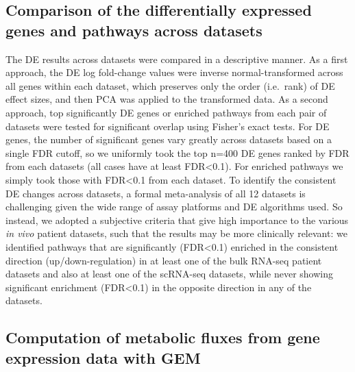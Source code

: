 \documentclass[12pt,twoside,openany,\mydriver]{thesis}  %
\begin{document}
\hypertarget{comparison-of-the-differentially-expressed-genes-and-pathways-across-datasets}{%
\subsection{Comparison of the differentially expressed genes and pathways across datasets}\label{comparison-of-the-differentially-expressed-genes-and-pathways-across-datasets}}

The DE results across datasets were compared in a descriptive manner. As a first approach, the DE log fold-change values were inverse normal-transformed across all genes within each dataset, which preserves only the order (i.e.~rank) of DE effect sizes, and then PCA was applied to the transformed data. As a second approach, top significantly DE genes or enriched pathways from each pair of datasets were tested for significant overlap using Fisher's exact tests. For DE genes, the number of significant genes vary greatly across datasets based on a single FDR cutoff, so we uniformly took the top n=400 DE genes ranked by FDR from each datasets (all cases have at least FDR\textless{}0.1). For enriched pathways we simply took those with FDR\textless{}0.1 from each dataset. To identify the consistent DE changes across datasets, a formal meta-analysis of all 12 datasets is challenging given the wide range of assay platforms and DE algorithms used. So instead, we adopted a subjective criteria that give high importance to the various \emph{in vivo} patient datasets, such that the results may be more clinically relevant: we identified pathways that are significantly (FDR\textless{}0.1) enriched in the consistent direction (up/down-regulation) in at least one of the bulk RNA-seq patient datasets and also at least one of the scRNA-seq datasets, while never showing significant enrichment (FDR\textless{}0.1) in the opposite direction in any of the datasets.

\hypertarget{computation-of-metabolic-fluxes-from-gene-expression-data-with-gem}{%
\subsection{Computation of metabolic fluxes from gene expression data with GEM}\label{computation-of-metabolic-fluxes-from-gene-expression-data-with-gem}}
\end{document}
